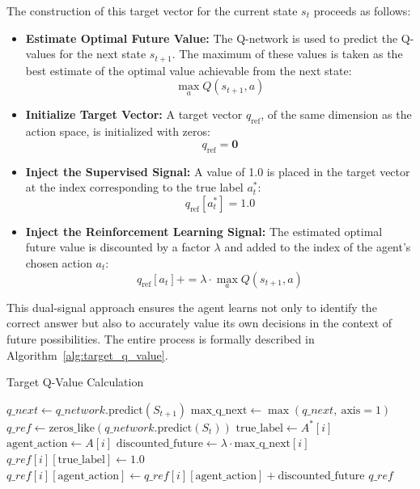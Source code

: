 \documentclass[12pt]{report}
\begin{document}
The construction of this target vector for the current state $s_t$ proceeds as follows:

\begin{itemize}
    \item \textbf{Estimate Optimal Future Value:} The Q-network is used to predict the Q-values for the next state $s_{t+1}$. The maximum of these values is taken as the best estimate of the optimal value achievable from the next state:
    \[
    \max_a Q(s_{t+1}, a)
    \]
    
    \item \textbf{Initialize Target Vector:} A target vector $q_\text{ref}$, of the same dimension as the action space, is initialized with zeros:
    \[
    q_\text{ref} = \mathbf{0}
    \]

    \item \textbf{Inject the Supervised Signal:} A value of 1.0 is placed in the target vector at the index corresponding to the true label $a_t^*$:
    \[
    q_\text{ref}[a_t^*] = 1.0
    \]

    \item \textbf{Inject the Reinforcement Learning Signal:} The estimated optimal future value is discounted by a factor $\lambda$ and added to the index of the agent’s chosen action $a_t$:
    \[
    q_\text{ref}[a_t] += \lambda \cdot \max_a Q(s_{t+1}, a)
    \]
\end{itemize}

This dual-signal approach ensures the agent learns not only to identify the correct answer but also to accurately value its own decisions in the context of future possibilities. The entire process is formally described in Algorithm~\ref{alg:target_q_value}.

\begin{algorithm}[H]
\caption{Target Q-Value Calculation}
\label{alg:target_q_value}
\begin{algorithmic}[1]
    \State $q\_next \gets q\_network.\text{predict}(S_{t+1})$
    \State $\text{max\_q\_next} \gets \max(q\_next,\ \text{axis}=1)$
    \State $q\_ref \gets \text{zeros\_like}(q\_network.\text{predict}(S_t))$
        \State $\text{true\_label} \gets A^*[i]$
        \State $\text{agent\_action} \gets A[i]$
        \State $\text{discounted\_future} \gets \lambda \cdot \text{max\_q\_next}[i]$
        \State $q\_ref[i][\text{true\_label}] \gets 1.0$
        \State $q\_ref[i][\text{agent\_action}] \gets q\_ref[i][\text{agent\_action}] + \text{discounted\_future}$
    \EndFor
    \State \Return $q\_ref$
\EndFunction
\end{algorithmic}
\end{algorithm}
\end{document}
